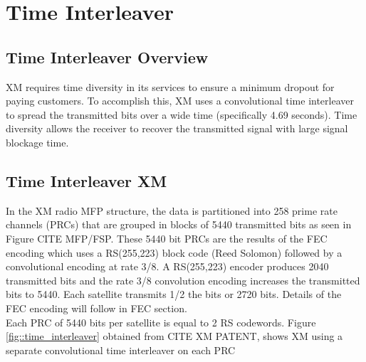\documentclass[conference,onecolumn]{IEEEtran}
\begin{document}
\section{Time Interleaver}
\subsection{Time Interleaver Overview}
XM requires time diversity in its services to ensure a minimum dropout for paying customers.  To accomplish this, XM uses a convolutional time interleaver to spread the transmitted bits over a wide time (specifically 4.69 seconds).  Time diversity allows the receiver to recover the transmitted signal with large signal blockage time. 

\subsection{Time Interleaver XM}
In the XM radio MFP structure, the data is partitioned into 258 prime rate channels (PRCs) that are grouped in blocks of 5440 transmitted bits  as seen in Figure {CITE MFP/FSP}.  These 5440 bit PRCs are the results of the FEC encoding which uses a RS(255,223) block code (Reed Solomon) followed by a convolutional encoding at rate 3/8.  A RS(255,223) encoder produces 2040 transmitted bits and the rate 3/8 convolution encoding increases the transmitted bits to 5440.  Each satellite transmits 1/2 the bits or 2720 bits.  Details of the FEC encoding will follow in FEC section.\\
Each PRC of 5440 bits per satellite is equal to 2 RS codewords.  Figure \ref{fig::time_interleaver} obtained from {CITE XM PATENT}, shows XM using a separate convolutional time interleaver on each PRC \\
\end{document}
